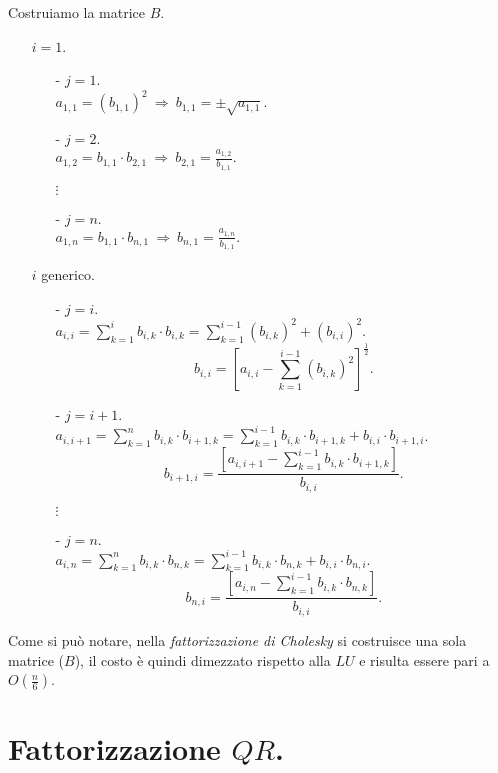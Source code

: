 Costruiamo la matrice $B$.
\begin{itemize}
\item[]$i = 1$.
  \begin{itemize}
    \item[-]$j = 1$.\\
    $a_{1,1} = (b_{1,1})^2\ \Longrightarrow\ b_{1,1} = \pm \sqrt{a_{1,1}}.$
    \item[-]$j = 2$.\\
    $a_{1,2} = b_{1,1}\cdot b_{2,1} \ \Longrightarrow\ b_{2,1} =
      \frac{a_{1,2}}{b_{1,1}}.$
    \item[] $\vdots$
    \item[-]$j = n$.\\
    $a_{1,n} = b_{1,1}\cdot b_{n,1}\ \Longrightarrow\ b_{n,1} =
      \frac{a_{1,n}}{b_{1,1}}.$
  \end{itemize}
\item[]$i$ generico.
  \begin{itemize}
    \item[-]$j = i$.\\
      $a_{i,i} = \sum_{k =1}^ib_{i,k}\cdot b_{i,k} = \sum_{k = 1}^{i-1}(b_{i,k})^2
      + (b_{i,i})^{2}$.
    \[b_{i,i} = \left[ a_{i,i} - \sum_{k = 1}^{i-1}(b_{i,k})^2\right]^{\frac{1}{2}}.\]
    \item[-]$j = i+1$.\\
      $a_{i,i+1} = \sum_{k =1}^nb_{i,k}\cdot b_{i+1,k} = \sum_{k = 1}^{i-1}b_{i,k}
      \cdot b_{i+1,k} + b_{i,i}\cdot b_{i+1,i}$.
    \[b_{i+1,i} = \frac{\left[ a_{i,i+1} - \sum_{k = 1}^{i-1}b_{i,k}\cdot b_{i+1,k}
    \right]}{b_{i,i}}.\]
    \item[] $\vdots$
    \item[-]$j = n$.\\
      $a_{i,n} = \sum_{k =1}^nb_{i,k}\cdot b_{n,k} = \sum_{k = 1}^{i-1}b_{i,k}
      \cdot b_{n,k} + b_{i,i}\cdot b_{n,i}$.
    \[b_{n,i} = \frac{\left[ a_{i,n} - \sum_{k = 1}^{i-1}b_{i,k}\cdot b_{n,k}
    \right]}{b_{i,i}}.\]
  \end{itemize}
\end{itemize}

\begin{osse}Come si può notare, nella \emph{fattorizzazione di Cholesky} si costruisce
una sola matrice ($B$), il costo è quindi dimezzato rispetto alla $LU$ e risulta essere
pari a $O(\frac{n}{6})$.
\end{osse}

\section{Fattorizzazione $QR$.}

